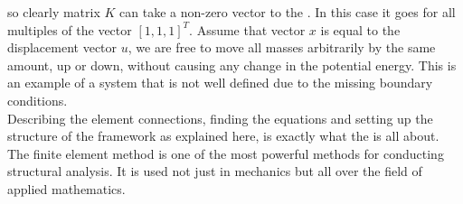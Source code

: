 so clearly matrix $K$ can take a non-zero vector to
the . In this case it goes for all multiples of the vector
$[1,1,1]^T$. Assume that vector $x$ is equal to the displacement vector $u$, we are free to
move all masses arbitrarily by the same amount, up or down, without causing any
change in the potential energy. This is an example of a system that is not well defined
due to the missing boundary conditions. \\




  


Describing the element connections, finding the equations
and setting up the structure of the framework as explained here, is
exactly what the  is all about. 
The finite element method is one of the most powerful methods for
conducting structural analysis. It is used not
just in mechanics but all over the field of applied
mathematics. \\




 

